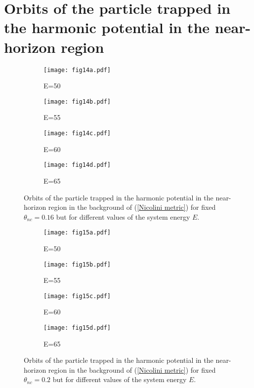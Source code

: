 \documentclass[aps,prd,showpacs,nofootinbib,floats,floatfix,preprintnumbers,groupedaddress,twocolumn]{revtex4-1}
\begin{document}
\section{{\label{App2}}Orbits of the particle trapped in the harmonic potential in the near-horizon region}
%
%
%
%
\begin{figure}[H]
	\centering
		\begin{subfigure}[b]{0.49\linewidth}
		\texttt{[image: fig14a.pdf]}
		\caption{E=50}
	\end{subfigure}
	\begin{subfigure}[b]{0.49\linewidth}
		\texttt{[image: fig14b.pdf]}
		\caption{E=55}
	\end{subfigure}
	\begin{subfigure}[b]{0.49\linewidth}
		\texttt{[image: fig14c.pdf]}
		\caption{E=60}
	\end{subfigure}
	\begin{subfigure}[b]{0.49\linewidth}
		\texttt{[image: fig14d.pdf]}
		\caption{E=65}
	\end{subfigure}
	\caption{Orbits of the particle trapped in the harmonic potential in the near-horizon region in the background of (\ref{Nicolini metric}) for fixed $\theta_{nc}=0.16$ but for different values of the system energy $E$.}
	\label{fig:14}
\end{figure}
%
%
%
%
%
\begin{figure}[H]
	\centering
	\begin{subfigure}[b]{0.49\linewidth}
		\texttt{[image: fig15a.pdf]}
		\caption{E=50}
	\end{subfigure}
	\begin{subfigure}[b]{0.49\linewidth}
		\texttt{[image: fig15b.pdf]}
		\caption{E=55}
	\end{subfigure}
	\begin{subfigure}[b]{0.49\linewidth}
		\texttt{[image: fig15c.pdf]}
		\caption{E=60}
	\end{subfigure}
	\begin{subfigure}[b]{0.49\linewidth}
		\texttt{[image: fig15d.pdf]}
		\caption{E=65}
	\end{subfigure}
	\caption{Orbits of the particle trapped in the harmonic potential in the near-horizon region in the background of (\ref{Nicolini metric}) for fixed $\theta_{nc}=0.2$ but for different values of the system energy $E$.}
	\label{fig:15}
\end{figure}
%
%
%
%
%
\end{document}

